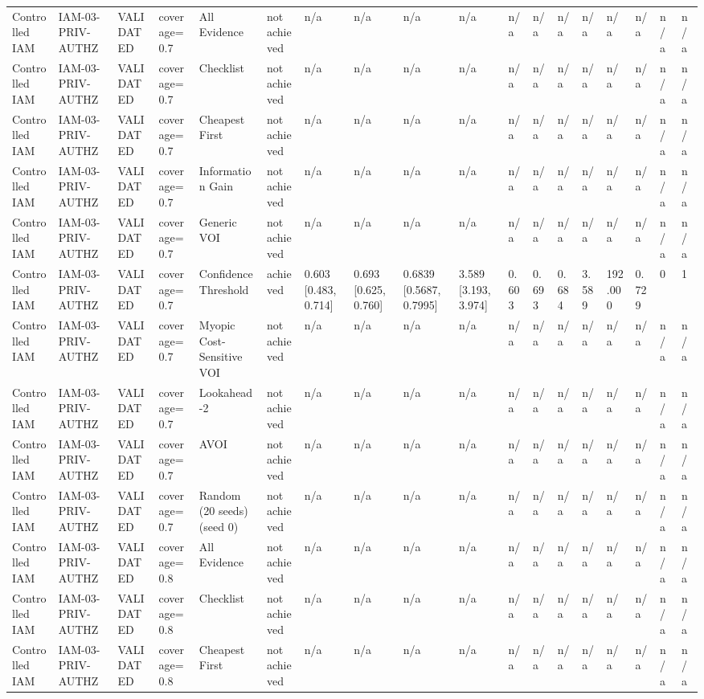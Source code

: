 \begin{table}[!ht]
{\begin{tabular}{llllllllllllllllll}
Controlled IAM & IAM-03-PRIV-AUTHZ & VALIDATED & coverage=0.7 & All Evidence & not achieved & n/a & n/a & n/a & n/a & n/a & n/a & n/a & n/a & n/a & n/a & n/a & n/a \\
Controlled IAM & IAM-03-PRIV-AUTHZ & VALIDATED & coverage=0.7 & Checklist & not achieved & n/a & n/a & n/a & n/a & n/a & n/a & n/a & n/a & n/a & n/a & n/a & n/a \\
Controlled IAM & IAM-03-PRIV-AUTHZ & VALIDATED & coverage=0.7 & Cheapest First & not achieved & n/a & n/a & n/a & n/a & n/a & n/a & n/a & n/a & n/a & n/a & n/a & n/a \\
Controlled IAM & IAM-03-PRIV-AUTHZ & VALIDATED & coverage=0.7 & Information Gain & not achieved & n/a & n/a & n/a & n/a & n/a & n/a & n/a & n/a & n/a & n/a & n/a & n/a \\
Controlled IAM & IAM-03-PRIV-AUTHZ & VALIDATED & coverage=0.7 & Generic VOI & not achieved & n/a & n/a & n/a & n/a & n/a & n/a & n/a & n/a & n/a & n/a & n/a & n/a \\
Controlled IAM & IAM-03-PRIV-AUTHZ & VALIDATED & coverage=0.7 & Confidence Threshold & achieved & 0.603 [0.483, 0.714] & 0.693 [0.625, 0.760] & 0.6839 [0.5687, 0.7995] & 3.589 [3.193, 3.974] & 0.603 & 0.693 & 0.684 & 3.589 & 192.000 & 0.729 & 0 & 1 \\
Controlled IAM & IAM-03-PRIV-AUTHZ & VALIDATED & coverage=0.7 & Myopic Cost-Sensitive VOI & not achieved & n/a & n/a & n/a & n/a & n/a & n/a & n/a & n/a & n/a & n/a & n/a & n/a \\
Controlled IAM & IAM-03-PRIV-AUTHZ & VALIDATED & coverage=0.7 & Lookahead-2 & not achieved & n/a & n/a & n/a & n/a & n/a & n/a & n/a & n/a & n/a & n/a & n/a & n/a \\
Controlled IAM & IAM-03-PRIV-AUTHZ & VALIDATED & coverage=0.7 & AVOI & not achieved & n/a & n/a & n/a & n/a & n/a & n/a & n/a & n/a & n/a & n/a & n/a & n/a \\
Controlled IAM & IAM-03-PRIV-AUTHZ & VALIDATED & coverage=0.7 & Random (20 seeds) (seed 0) & not achieved & n/a & n/a & n/a & n/a & n/a & n/a & n/a & n/a & n/a & n/a & n/a & n/a \\
Controlled IAM & IAM-03-PRIV-AUTHZ & VALIDATED & coverage=0.8 & All Evidence & not achieved & n/a & n/a & n/a & n/a & n/a & n/a & n/a & n/a & n/a & n/a & n/a & n/a \\
Controlled IAM & IAM-03-PRIV-AUTHZ & VALIDATED & coverage=0.8 & Checklist & not achieved & n/a & n/a & n/a & n/a & n/a & n/a & n/a & n/a & n/a & n/a & n/a & n/a \\
Controlled IAM & IAM-03-PRIV-AUTHZ & VALIDATED & coverage=0.8 & Cheapest First & not achieved & n/a & n/a & n/a & n/a & n/a & n/a & n/a & n/a & n/a & n/a & n/a & n/a \\

\end{tabular}}
\end{table}
